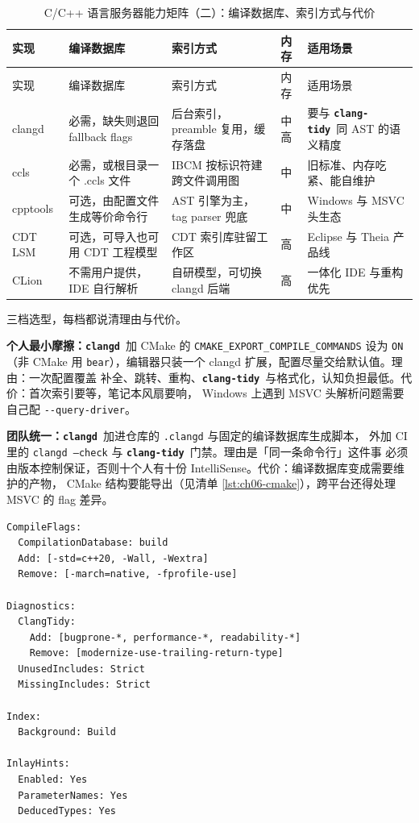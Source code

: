 \documentclass[12pt,a4paper,fontset=fandol]{ctexbook}
\newcommand{\Opt}[1]{\texttt{-\/-#1}}
\newcommand{\Lib}[1]{\textbf{\texttt{#1}}}
\newcommand{\Tidy}{\Lib{clang-tidy}}
\newcommand{\CD}{\Lib{clangd}}
\begin{document}
{\small\setlength{\tabcolsep}{3pt}
\begin{longtable}{>{\raggedright\arraybackslash}p{} >{\raggedright\arraybackslash}p{} >{\raggedright\arraybackslash}p{} >{\raggedright\arraybackslash}p{} >{\raggedright\arraybackslash}p{}}
\caption{C/C++ 语言服务器能力矩阵（二）：编译数据库、索引方式与代价}\label{tab:ch06-cost}\\
\toprule
实现 & 编译数据库 & 索引方式 & 内存 & 适用场景 \\
\midrule
\endfirsthead
\toprule
实现 & 编译数据库 & 索引方式 & 内存 & 适用场景 \\
\midrule
\endhead
\bottomrule
\endfoot
clangd & 必需，缺失则退回 fallback flags & 后台索引，preamble 复用，缓存落盘 & 中高 & 要与 \Tidy\ 同 AST 的语义精度 \\
ccls & 必需，或根目录一个 .ccls 文件 & IBCM 按标识符建跨文件调用图 & 中 & 旧标准、内存吃紧、能自维护 \\
cpptools & 可选，由配置文件生成等价命令行 & AST 引擎为主，tag parser 兜底 & 中 & Windows 与 MSVC 头生态 \\
CDT LSM & 可选，可导入也可用 CDT 工程模型 & CDT 索引库驻留工作区 & 高 & Eclipse 与 Theia 产品线 \\
CLion & 不需用户提供，IDE 自行解析 & 自研模型，可切换 clangd 后端 & 高 & 一体化 IDE 与重构优先 \\
\end{longtable}}

三档选型，每档都说清理由与代价。

\textbf{个人最小摩擦：}\CD\ 加 CMake 的
\texttt{CMAKE\_EXPORT\_COMPILE\_COMMANDS} 设为 \texttt{ON}（非 CMake 用
\texttt{bear}），编辑器只装一个 clangd 扩展，配置尽量交给默认值。理由：一次配置覆盖
补全、跳转、重构、\Tidy\ 与格式化，认知负担最低。代价：首次索引要等，笔记本风扇要响，
Windows 上遇到 MSVC 头解析问题需要自己配 \Opt{query-driver}。

\textbf{团队统一：}\CD\ 加进仓库的 \texttt{.clangd} 与固定的编译数据库生成脚本，
外加 CI 里的 \texttt{clangd --check} 与 \Tidy\ 门禁。理由是「同一条命令行」这件事
必须由版本控制保证，否则十个人有十份 IntelliSense。代价：编译数据库变成需要维护的产物，
CMake 结构要能导出（见清单 \ref{lst:ch06-cmake}），跨平台还得处理 MSVC 的 flag 差异。

\begin{lstlisting}[style=yamlstyle,caption={提交进仓库的 .clangd：把命令行补齐与诊断策略固定下来},label={lst:ch06-clangd}]
CompileFlags:
  CompilationDatabase: build
  Add: [-std=c++20, -Wall, -Wextra]
  Remove: [-march=native, -fprofile-use]

Diagnostics:
  ClangTidy:
    Add: [bugprone-*, performance-*, readability-*]
    Remove: [modernize-use-trailing-return-type]
  UnusedIncludes: Strict
  MissingIncludes: Strict

Index:
  Background: Build

InlayHints:
  Enabled: Yes
  ParameterNames: Yes
  DeducedTypes: Yes
\end{lstlisting}
\end{document}
